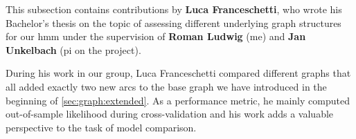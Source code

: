 \begin{tcolorbox}[
    title=\faIcon{users} Contributions,
    parbox=false,
    float
]
    This subsection contains contributions by  \textbf{Luca Franceschetti}, who wrote his Bachelor's thesis \cite{franceschetti_comparison_2022} on the topic of assessing different underlying graph structures for our \gls{hmm} under the supervision of  \textbf{Roman Ludwig} (me) and  \textbf{Jan Unkelbach} (\gls{pi} on the project).

    During his work in our group, Luca Franceschetti compared different graphs that all added exactly two new arcs to the base graph we have introduced in the beginning of \cref{sec:graph:extended}. As a performance metric, he mainly computed out-of-sample likelihood during cross-validation and his work adds a valuable perspective to the task of model comparison.
\end{tcolorbox}
